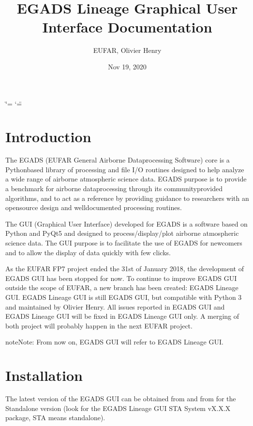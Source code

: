 \documentclass[a4paper,10pt,openany,english]{sphinxmanual}
\title{EGADS Lineage Graphical User Interface Documentation}
\date{Nov 19, 2020}
\author{EUFAR, Olivier Henry}
\begin{document}
\ifdefined\shorthandoff
  \ifnum\catcode`\=\string=\active\shorthandoff{=}\fi
  \ifnum\catcode`\"=\active{}\fi
\fi

\pagestyle{empty}
\sphinxmaketitle
\pagestyle{plain}
\sphinxtableofcontents
\pagestyle{normal}
\label{\detokenize{index::doc}}



\chapter{Introduction}
\label{\detokenize{intro:introduction}}\label{\detokenize{intro::doc}}
The EGADS (EUFAR General Airborne Data\sphinxhyphen{}processing Software) core is a Python\sphinxhyphen{}based library of processing and file I/O routines designed to help analyze a wide range of airborne atmospheric science data. EGADS purpose is to provide a benchmark for airborne data\sphinxhyphen{}processing through its community\sphinxhyphen{}provided algorithms, and to act as a reference by providing guidance to researchers with an open\sphinxhyphen{}source design and well\sphinxhyphen{}documented processing routines.

The GUI (Graphical User Interface) developed for EGADS is a software based on Python and PyQt5 and designed to process/display/plot airborne atmospheric science data. The GUI purpose is to facilitate the use of EGADS for newcomers and to allow the display of data quickly with few clicks.

As the EUFAR FP7 project ended the 31st of January 2018, the development of EGADS GUI has been stopped for now. To continue to improve EGADS GUI outside the scope of EUFAR, a new branch has been created: EGADS Lineage GUI. EGADS Lineage GUI is still EGADS GUI, but compatible with Python 3 and maintained by Olivier Henry. All issues reported in EGADS GUI and EGADS Lineage GUI will be fixed in EGADS Lineage GUI only. A merging of both project will probably happen in the next EUFAR project.

\begin{sphinxadmonition}{note}{Note:}
From now on, EGADS GUI will refer to EGADS Lineage GUI.
\end{sphinxadmonition}


\chapter{Installation}
\label{\detokenize{install:installation}}\label{\detokenize{install::doc}}
The latest version of the EGADS GUI can be obtained from  and from  for the Stand\sphinxhyphen{}alone version (look for the EGADS Lineage GUI STA System vX.X.X package, STA means stand\sphinxhyphen{}alone).
\end{document}
